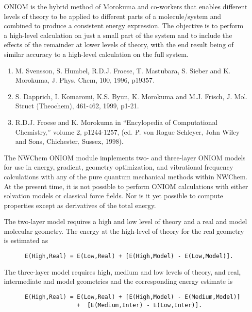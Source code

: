 \label{sec:oniom}

ONIOM is the hybrid method of Morokuma and co-workers that enables
different levels of theory to be applied to different parts of a
molecule/system and combined to produce a consistent energy
expression.  The objective is to perform a high-level calculation on
just a small part of the system and to include the effects of the
remainder at lower levels of theory, with the end result being of
similar accuracy to a high-level calculation on the full system.

\begin{enumerate}
\item M. Svensson, S. Humbel, R.D.J. Froese, T. Mastubara, S. Sieber and
K. Morokuma, J. Phys. Chem, 100, 1996, p19357.
\item  S. Dapprich, I. Komaromi, K.S. Byun, K. Morokuma and M.J. Frisch,
J. Mol. Struct (Theochem), 461-462, 1999, p1-21.
\item R.D.J. Froese and K. Morokuma in ``Encylopedia of Computational Chemistry,'' 
volume 2, p1244-1257, (ed. P. von Rague Schleyer, John Wiley and Sons, 
Chichester, Sussex, 1998).
\end{enumerate}

The NWChem ONIOM module implements two- and three-layer ONIOM models
for use in energy, gradient, geometry optimization, and vibrational
frequency calculations with any of the pure quantum mechanical methods
within NWChem.  At the present time, it is not possible to perform
ONIOM calculations with either solvation models or classical force
fields.  Nor is it yet possible to compute properties except as
derivatives of the total energy.  

The two-layer model requires a high and low level of theory and a
real and model molecular geometry.  The energy at the high-level of
theory for the real geometry is estimated as
\begin{verbatim}
      E(High,Real) = E(Low,Real) + [E(High,Model) - E(Low,Model)].
\end{verbatim}
The three-layer model requires high, medium and low levels of theory,
and real, intermediate and model geometries and the corresponding
energy estimate is
\begin{verbatim}
      E(High,Real) = E(Low,Real) + [E(High,Model) - E(Medium,Model)]
                     +  [E(Medium,Inter) - E(Low,Inter)].
\end{verbatim}

